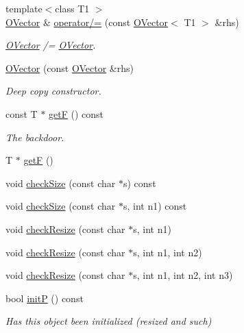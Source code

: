\begin{DoxyCompactItemize}
{\footnotesize template$<$class T1 $>$ }\\\mbox{\hyperlink{classENSEM_1_1OVector}{O\+Vector}} \& \mbox{\hyperlink{classENSEM_1_1OVector_a61d1911393adf46629dd493ef09c1022}{operator/=}} (const \mbox{\hyperlink{classENSEM_1_1OVector}{O\+Vector}}$<$ T1 $>$ \&rhs)
\begin{DoxyCompactList}\small\item\em \mbox{\hyperlink{classENSEM_1_1OVector}{O\+Vector}} /= \mbox{\hyperlink{classENSEM_1_1OVector}{O\+Vector}}. \end{DoxyCompactList}\item 
\mbox{\hyperlink{classENSEM_1_1OVector_a10129359c78668211e551f3b13829208}{O\+Vector}} (const \mbox{\hyperlink{classENSEM_1_1OVector}{O\+Vector}} \&rhs)
\begin{DoxyCompactList}\small\item\em Deep copy constructor. \end{DoxyCompactList}\item 
const T $\ast$ \mbox{\hyperlink{classENSEM_1_1OVector_ab4767b83741c029b996a49662c021f88}{getF}} () const
\begin{DoxyCompactList}\small\item\em The backdoor. \end{DoxyCompactList}\item 
T $\ast$ \mbox{\hyperlink{classENSEM_1_1OVector_a73065fd6ed2149ce8699996d691c4c42}{getF}} ()
\item 
void \mbox{\hyperlink{classENSEM_1_1OVector_a12d09a71bb2808a7404578da9ba41c4f}{check\+Size}} (const char $\ast$s) const
\item 
void \mbox{\hyperlink{classENSEM_1_1OVector_a1446ad09778db3a287fb5f6fec304b22}{check\+Size}} (const char $\ast$s, int n1) const
\item 
void \mbox{\hyperlink{classENSEM_1_1OVector_a95545451bb9d6be83ba32ad3dc2dab42}{check\+Resize}} (const char $\ast$s, int n1)
\item 
void \mbox{\hyperlink{classENSEM_1_1OVector_acd8960fbc5b7df8aabf14ca8ca50f7ab}{check\+Resize}} (const char $\ast$s, int n1, int n2)
\item 
void \mbox{\hyperlink{classENSEM_1_1OVector_ac909025f6c5d78479f5dcbef8151d571}{check\+Resize}} (const char $\ast$s, int n1, int n2, int n3)
\item 
bool \mbox{\hyperlink{classENSEM_1_1OVector_ae1c9e62826d9b61edc7f85d8f8aedf79}{initP}} () const
\begin{DoxyCompactList}\small\item\em Has this object been initialized (resized and such) \end{DoxyCompactList}\item 

\end{DoxyCompactItemize}
